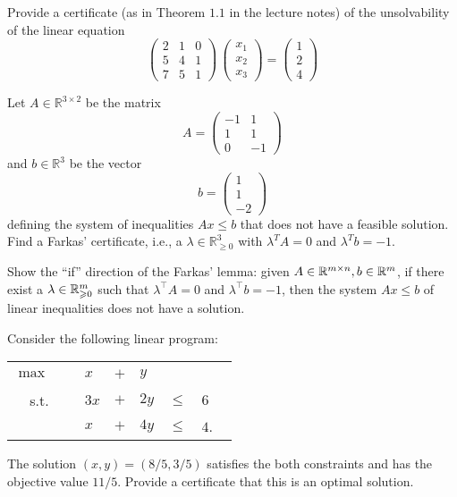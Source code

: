 \documentclass[11pt]{article}
\institute{\'Ecole Polytechnique F\'ed\'erale de Lausanne}
\begin{document}
\makeheader

\problem
Provide a certificate (as in Theorem $1.1$ in the lecture notes) of the unsolvability of the linear equation 
  \begin{displaymath}
    \begin{pmatrix}
      2 & 1 & 0 \\
      5 & 4 & 1 \\
      7 & 5 & 1
    \end{pmatrix} \,
    \begin{pmatrix}
      x_1 \\ x_2 \\ x_3 
    \end{pmatrix} =
    \begin{pmatrix}
      1\\2\\4
    \end{pmatrix}
  \end{displaymath}

  \problem

  Let $A ∈ ℝ^{3 ×2}$ be the matrix
  \begin{displaymath}
    A =
    \begin{pmatrix}
      -1 & 1 \\
      1 & 1 \\
      0 & -1 
    \end{pmatrix}
  \end{displaymath}
  and $b ∈ ℝ^3$ be the vector
  \begin{displaymath}
    b =
    \begin{pmatrix}
      1 \\ 1 \\ -2
    \end{pmatrix}
  \end{displaymath}
defining the system of inequalities $Ax ≤b$ that does not have a feasible solution. Find a Farkas' certificate, i.e., a  $λ ∈ ℝ^3_{≥0}$ with $λ^TA = 0$ and $λ^T b = -1$. 
  

 \problem Show the ``if'' direction of the Farkas' lemma: given $A\in \mathbb{R}^{m\times n}, b\in \mathbb{R}^m$, if there exist a $\lambda \in \mathbb{R}^m_{\geqslant 0}$ such that $\lambda^\top A=0$ and $\lambda^\top b=-1$, then the system $Ax\leq b$ of linear inequalities does not have a solution. 
 
\problem Consider the following linear program:
\begin{center}
\begin{tabular}{rllllll}
$\max$ & \ & $x$ & $+$ & $y$ & \ & \\ 
s.t. & \ & $3x$ & $+$ & $2y$ & $\leq$ & $6$ \\ 
\ & \ & $x$ & $+$ & $4y$ & $\leq$ & $4$. \
\end{tabular} 
\end{center} 
The solution $(x, y)=(8/5 , 3/5)$ satisfies the both constraints and has the objective value $11/5$. Provide a certificate that this is an optimal solution.
\end{document}
